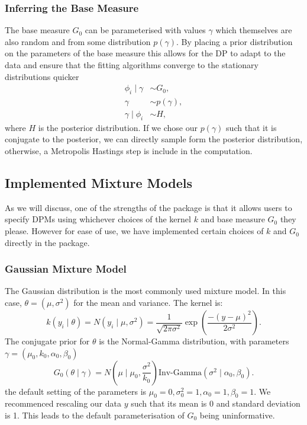 \documentclass[nojss]{jss}
\begin{document}
\subsubsection{Inferring the Base Measure}

The base measure $G_0$ can be parameterised with values $\gamma$ which themselves are also random and from some distribution $p(\gamma)$. By placing a prior distribution on the parameters of the base measure this allows for the DP to adapt to the data and ensure that the fitting algorithms converge to the stationary distributions quicker
\begin{align*}
\phi _i \mid \gamma & \sim G_0, \\
\gamma & \sim p(\gamma), \\
\gamma \mid \phi _i & \sim H,
\end{align*}
where $H$ is the posterior distribution. If we chose our $p(\gamma)$ such that it is conjugate to the posterior, we can directly sample form the posterior distribution, otherwise, a Metropolis Hastings step is include in the computation.

\subsection{Implemented Mixture Models} \label{subsec:implemented}
As we will discuss, one of the strengths of the  package is that it allows users to specify DPMs using whichever choices of the kernel $k$ and base measure $G_0$ they please. However for ease of use, we have implemented certain choices of $k$ and $G_0$ directly in the package.

\subsubsection{Gaussian Mixture Model}
The Gaussian distribution is the most commonly used mixture model. In this case, $\theta = (\mu,\sigma^2)$ for the mean and variance. The kernel is:
\begin{equation}
k(y_i \mid \theta) = N(y_i \mid \mu, \sigma^2) = \frac{1}{\sqrt{2\pi \sigma^2}} \exp \left( \frac{ -(y-\mu)^2}{2\sigma^2} \right).
\end{equation}
The conjugate prior for $\theta$ is the Normal-Gamma distribution, with parameters $\gamma = (\mu_0, k_0, \alpha_0, \beta_0)$
\begin{equation}
G_0(\theta \mid \gamma) =  N\left(\mu \mid \mu_0, \frac{\sigma^2}{k_0} \right) \text{Inv-Gamma} \left(\sigma^2 \mid \alpha_0, \beta_0 \right).
\end{equation}
the default setting of the parameters is $\mu_0 = 0, \sigma _0 ^2 = 1, \alpha _0 = 1, \beta _0 = 1$.
We recommenced rescaling our data $y$ such that its mean is 0 and standard deviation is 1. This leads to the default parameterisation of $G_0$ being uninformative.
\end{document}
